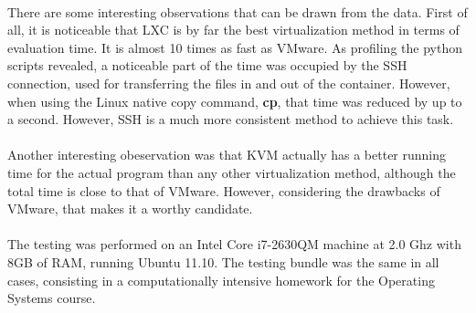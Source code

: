 \paragraph { }

There are some interesting observations that can be drawn from the data. First
of all, it is noticeable that LXC is by far the best virtualization method
in terms of evaluation time. It is almost 10 times as fast as VMware.
As profiling the python scripts revealed, a noticeable part of the time
was occupied by the SSH connection, used for transferring the files in and out
of the container. However, when using the Linux native copy command, {\bf cp},
that time was reduced by up to a second. However, SSH is a much more
consistent method to achieve this task.

\paragraph { }

Another interesting obeservation was that KVM actually has a better running
time for the actual program than any other virtualization method,
 although the total time is close to that of VMware. 
 However, considering the drawbacks of VMware, that makes it a worthy candidate.

\paragraph { } 

The testing was performed on an Intel Core i7-2630QM machine at 2.0 Ghz with 8GB
of RAM, running Ubuntu 11.10. The testing bundle was the same in all cases,
consisting in a computationally intensive homework for the Operating Systems course.


